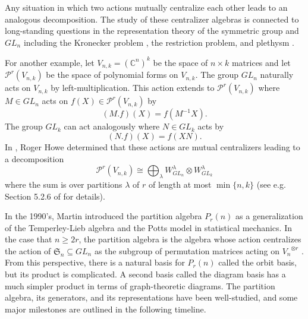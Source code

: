 \documentclass[ALCO,Unicode,published]{cedram}
\newcommand{\C}{\mathbb{C}}
\newcommand{\PP}{\mathcal{P}}
\newcommand{\SG}{\mathfrak{S}}
\begin{document}
Any situation in which two actions mutually centralize each other leads to an analogous decomposition. The study of these centralizer algebras is connected to long-standing questions in the representation theory of the symmetric group and $GL_n$ including the Kronecker problem \cite{bowman2015partition,orellana2020howe}, the restriction problem, and plethysm \cite{orellana2021uniform}.

For another example, let $V_{n,k}=(\C^n)^k$ be the space of $n\times k$ matrices and let $\PP^r(V_{n,k})$ be the space of polynomial forms on $V_{n,k}$. The group $GL_n$ naturally acts on $V_{n,k}$ by left-multiplication. This action extends to $\PP^r(V_{n,k})$ where $M\in GL_n$ acts on $f(X)\in\PP^r(V_{n,k})$ by \[(M.f)(X)=f(M^{-1}X).\] The group $GL_k$ can act analogously where $N\in GL_k$ acts by \[(N.f)(X)=f(XN).\] In \cite{howe}, Roger Howe determined that these actions are mutual centralizers leading to a decomposition \[\PP^r(V_{n,k})\cong\bigoplus_{\lambda} W_{GL_n}^\lambda\otimes W_{GL_k}^\lambda\] where the sum is over partitions $\lambda$ of $r$ of length at most $\min\{n,k\}$ (see e.g. Section 5.2.6 of \cite{gw} for details).

In the 1990's, Martin \cite{martin} introduced the partition algebra $P_r(n)$ as a generalization of the Temperley-Lieb algebra and the Potts model in statistical mechanics. In the case that $n\geq 2r$, the partition algebra is the algebra whose action centralizes the action of $\SG_n\subseteq GL_n$ as the subgroup of permutation matrices acting on ${V_n}^{\otimes r}$ \cite{jones1993potts,martin1991potts,Martin1994AlgebrasIH}. From this perspective, there is a natural basis for $P_r(n)$ called the orbit basis, but its product is complicated. A second basis called the diagram basis has a much simpler product in terms of graph-theoretic diagrams. The partition algebra, its generators, and its representations have been well-studied, and some major milestones are outlined in the following timeline.
\end{document}
